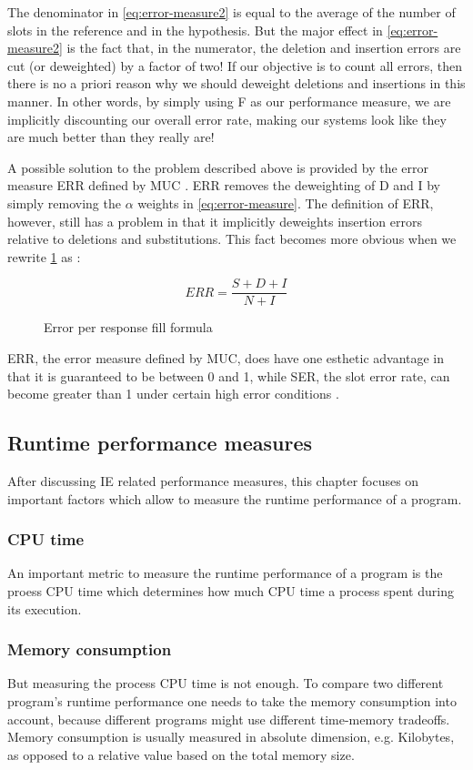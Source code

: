 The denominator in \ref{eq:error-measure2} is equal to the average of the number of slots in the reference and in the hypothesis. But the major effect in \ref{eq:error-measure2} is the fact that, in the numerator, the deletion and insertion errors are cut (or deweighted) by a factor of two! If our objective is to count all errors, then there is no a priori reason why we should deweight deletions and insertions in this manner. In other words, by simply using F as our performance measure, we are implicitly discounting our overall error rate, making our systems look like they are much better than they really are! \cite{Makhoul:1999}

A possible solution to the problem described above is provided by the error measure ERR defined by MUC \cite{Chinchor:1995}\cite{Makhoul:1999}. ERR removes the deweighting of D and I by simply removing the $\alpha$ weights in \ref{eq:error-measure}. The definition of ERR, however, still has a problem in that it implicitly deweights insertion errors relative to deletions and substitutions. This fact becomes more obvious when we rewrite \ref{eq:error-per-response-fill2} as \cite{Makhoul:1999}:

\begin{figure}[H]
\begin{displaymath}
	ERR = \frac{S+D+I}{N+I}
\end{displaymath}
\caption{Error per response fill formula}
\label{eq:error-per-response-fill2}
\end{figure}

ERR, the error measure defined by MUC, does have one esthetic advantage in that it is guaranteed to be between 0 and 1, while SER, the slot error rate, can become greater than 1 under certain high error conditions \cite{Makhoul:1999}.

\newpage
\subsection{Runtime performance measures}
After discussing \gls{IE} related performance measures, this chapter focuses on important factors which allow to measure the runtime performance of a program.

\subsubsection{CPU time}
An important metric to measure the runtime performance of a program is the proess CPU time which determines how much CPU time a process spent during its execution. 

\subsubsection{Memory consumption}
But measuring the process CPU time is not enough. To compare two different program's runtime performance one needs to take the memory consumption into account, because different programs might use different time-memory tradeoffs. Memory consumption is usually measured in absolute dimension, e.g. Kilobytes, as opposed to a relative value based on the total memory size.